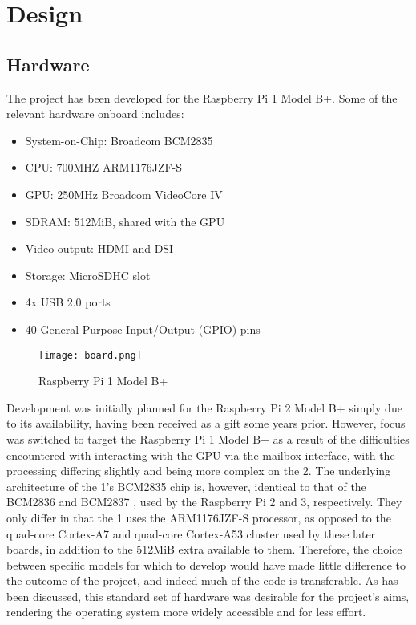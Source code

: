 \section{Design}
\subsection{Hardware}
    The project has been developed for the Raspberry Pi 1 Model B+.
    Some of the relevant hardware onboard includes:
    \begin{itemize}
        \itemsep0em
        \item System-on-Chip: Broadcom BCM2835
        \item CPU: 700MHZ ARM1176JZF-S
        \item GPU: 250MHz Broadcom VideoCore IV
        \item SDRAM: 512MiB, shared with the GPU
        \item Video output: HDMI and DSI
        \item Storage: MicroSDHC slot
        \item 4x USB 2.0 ports
        \item 40 General Purpose Input/Output (GPIO) pins
    \end{itemize}

    \begin{figure}[h]
        \centering
        \texttt{[image: board.png]}
        \caption{Raspberry Pi 1 Model B+}
    \end{figure}

    Development was initially planned for the Raspberry Pi 2 Model B+ simply due
    to its availability, having been received as a gift some years prior.
    However, focus was switched to target the Raspberry Pi 1 Model B+ as a
    result of the difficulties encountered with interacting with the GPU via the
    mailbox interface, with the processing differing slightly and being more
    complex on the 2. The underlying architecture of the 1's BCM2835 chip is,
    however, identical to that of the BCM2836 and BCM2837
    \cite{IdenticalArchitecture}, used by the Raspberry Pi 2 and 3,
    respectively. They only differ in that the 1 uses the ARM1176JZF-S
    processor, as opposed to the quad-core Cortex-A7 and quad-core Cortex-A53
    cluster used by these later boards, in addition to the 512MiB extra
    available to them. Therefore, the choice between specific models for which
    to develop would have made little difference to the outcome of the project,
    and indeed much of the code is transferable. As has been discussed, this
    standard set of hardware was desirable for the project's aims, rendering the
    operating system more widely accessible and for less effort.

